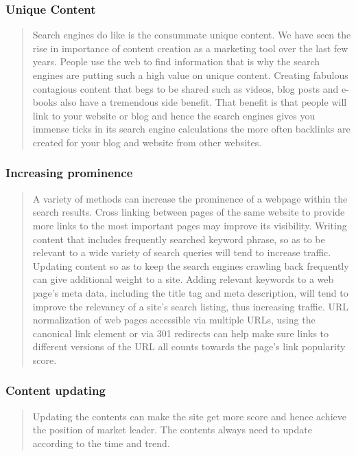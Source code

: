 \documentclass[35pt]{report}
\begin{document}
		\subsubsection{Unique Content} 
\begin{quote}
Search engines do like is the consummate unique content. We have seen the rise in importance of content creation as a marketing tool over the last few years. People use the web to find information that is why the search engines are putting such a high value on unique content. Creating fabulous contagious content that begs to be shared such as videos, blog posts and e-books also have a tremendous side benefit.  That benefit is that people will link to your website or blog and hence the search engines gives you immense ticks in its search engine calculations the more often backlinks are created for your blog and website from other websites.
\end{quote}
		\subsubsection{Increasing prominence}
\begin{quote}
A variety of methods can increase the prominence of a webpage within the search results. Cross linking between pages of the same website to provide more links to the most important pages may improve its visibility. Writing content that includes frequently searched keyword phrase, so as to be relevant to a wide variety of search queries will tend to increase traffic. Updating content so as to keep the search engines crawling back frequently can give additional weight to a site. Adding relevant keywords to a web page's meta data, including the title tag and meta description, will tend to improve the relevancy of a site's search listing, thus increasing traffic. URL normalization of web pages accessible via multiple URLs, using the canonical link element or via 301 redirects can help make sure links to different versions of the URL all counts towards the page's link popularity score.
\end{quote}
		\subsubsection{Content updating}
\begin{quote}
Updating the contents can make the site get more score and hence achieve the position of market leader. The contents always need to update according to the time and trend.
 \end{quote}
\end{document}
